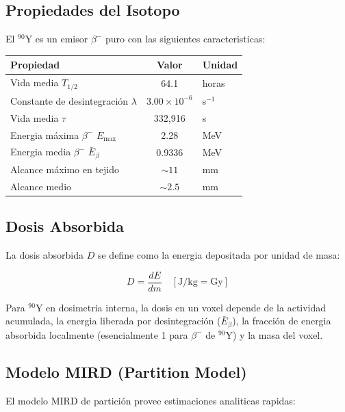 \documentclass[12pt,a4paper]{article}
\begin{document}
\subsection{Propiedades del Isotopo}

El $^{90}$Y es un emisor $\beta^-$ puro con las siguientes caracteristicas:

\begin{table}[H]
\centering
\begin{tabular}{l c l}
\toprule
\textbf{Propiedad} & \textbf{Valor} & \textbf{Unidad} \\
\midrule
Vida media $T_{1/2}$ & 64.1 & horas \\
Constante de desintegración $\lambda$ & $3.00 \times 10^{-6}$ & s$^{-1}$ \\
Vida media $\tau$ & 332,916 & s \\
Energia máxima $\beta^-$ $E_{\max}$ & 2.28 & MeV \\
Energia media $\beta^-$ $\bar{E}_\beta$ & 0.9336 & MeV \\
Alcance máximo en tejido & $\sim 11$ & mm \\
Alcance medio & $\sim 2.5$ & mm \\
\bottomrule
\end{tabular}
\end{table}

\subsection{Dosis Absorbida}

La dosis absorbida $D$ se define como la energia depositada por unidad de masa:

\begin{equation}\label{eq:dosis}
    D = \frac{dE}{dm} \quad [\text{J/kg} = \text{Gy}]
\end{equation}

Para $^{90}$Y en dosimetria interna, la dosis en un voxel depende de la actividad acumulada,
la energia liberada por desintegración ($\bar{E}_\beta$), la fracción de energia absorbida
localmente (esencialmente 1 para $\beta^-$ de $^{90}$Y) y la masa del voxel.

\subsection{Modelo MIRD (Partition Model)}

El modelo MIRD de partición provee estimaciones analiticas rapidas:
\end{document}
